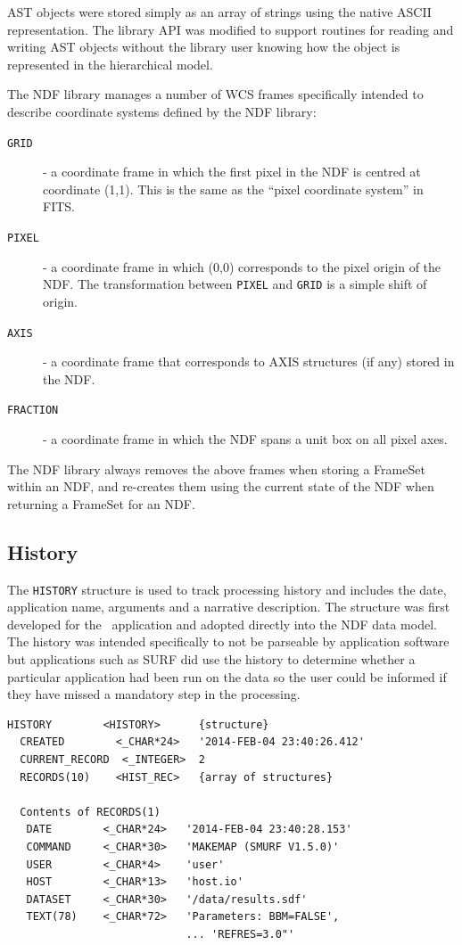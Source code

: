 \documentclass[final,authoryear,5p,times,twocolumn]{elsarticle}
\begin{document}
AST objects were stored simply as an array of strings using the native
ASCII representation. The library API was modified to support routines
for reading and writing AST objects without the library user knowing
how the object is represented in the hierarchical model.

The NDF library manages a number of WCS frames specifically intended to
describe coordinate systems defined by the NDF library:

\begin{description}
\item[\texttt{GRID}] - a coordinate frame in which the first pixel in the NDF is
centred at coordinate (1,1). This is the same as the ``pixel coordinate
system'' in FITS.
\item[\texttt{PIXEL}] - a coordinate frame in which (0,0) corresponds to
the pixel origin of the NDF. The transformation between \texttt{PIXEL}
and \texttt{GRID} is a simple shift of origin.
\item[\texttt{AXIS}] - a coordinate frame that corresponds to AXIS
structures (if any) stored in the NDF.
\item[\texttt{FRACTION}] - a coordinate frame in which the NDF spans a
unit box on all pixel axes.
\end{description}

The NDF library always removes the above frames when storing a FrameSet
within an NDF, and re-creates them using the current state of the NDF
when returning a FrameSet for an NDF.

\subsection{History}

The \texttt{HISTORY} structure is used to track processing history and
includes the date, application name, arguments and a narrative
description. The structure was first developed for the
\asterix\ application and adopted directly into the NDF data
model. The history was intended specifically to not be parseable by
application software but applications such as SURF
\citep{1998ASPC..145..216J} did use the history to determine whether a
particular application had been run on the data so the user could be
informed if they have missed a mandatory step in the processing.

{\small
\begin{verbatim}
HISTORY        <HISTORY>      {structure}
  CREATED        <_CHAR*24>   '2014-FEB-04 23:40:26.412'
  CURRENT_RECORD  <_INTEGER>  2
  RECORDS(10)    <HIST_REC>   {array of structures}

  Contents of RECORDS(1)
   DATE        <_CHAR*24>   '2014-FEB-04 23:40:28.153'
   COMMAND     <_CHAR*30>   'MAKEMAP (SMURF V1.5.0)'
   USER        <_CHAR*4>    'user'
   HOST        <_CHAR*13>   'host.io'
   DATASET     <_CHAR*30>   '/data/results.sdf'
   TEXT(78)    <_CHAR*72>   'Parameters: BBM=FALSE',
                            ... 'REFRES=3.0"'
\end{verbatim}
}
\end{document}
